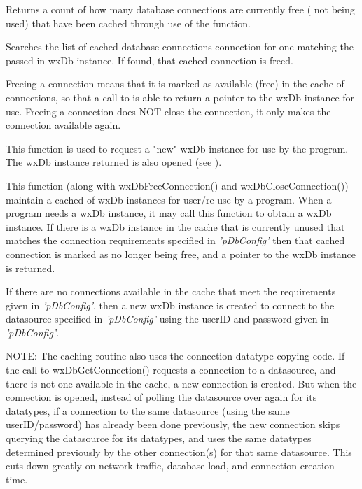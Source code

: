 

Returns a count of how many database connections are currently free ( not 
being used) that have been cached through use of the  
function.




Searches the list of cached database connections connection for one matching 
the passed in wxDb instance.  If found, that cached connection is freed.

Freeing a connection means that it is marked as available (free) in the 
cache of connections, so that a call to  
is able to return a pointer to the wxDb instance for use.  Freeing a 
connection does NOT close the connection, it only makes the connection 
available again.
 



This function is used to request a "new" wxDb instance for use by the program. 
The wxDb instance returned is also opened (see ).  

This function (along with wxDbFreeConnection() and wxDbCloseConnection()) 
maintain a cached of wxDb instances for user/re-use by a program.  When a 
program needs a wxDb instance, it may call this function to obtain a wxDb 
instance.  If there is a wxDb instance in the cache that is currently unused 
that matches the connection requirements specified in {\it'pDbConfig'} then 
that cached connection is marked as no longer being free, and a pointer to 
the wxDb instance is returned.

If there are no connections available in the cache that meet the requirements 
given in {\it'pDbConfig'}, then a new wxDb instance is created to connect 
to the datasource specified in {\it'pDbConfig'} using the userID and password 
given in {\it'pDbConfig'}.

NOTE: The caching routine also uses the  
connection datatype copying code.  If the call to wxDbGetConnection() 
requests a connection to a datasource, and there is not one available in the 
cache, a new connection is created.  But when the connection is opened, 
instead of polling the datasource over again for its datatypes, if a 
connection to the same datasource (using the same userID/password) has already 
been done previously, the new connection skips querying the datasource for 
its datatypes, and uses the same datatypes determined previously by the 
other connection(s) for that same datasource.  This cuts down greatly on 
network traffic, database load, and connection creation time.

